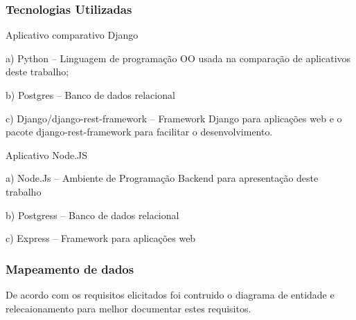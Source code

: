 \subsubsection{Tecnologias Utilizadas}


  Aplicativo comparativo Django
    
    \begin{compactitem}
      \item[a)] Python – Linguagem de programação OO usada na comparação de aplicativos deste trabalho;
      \item[b)] Postgres – Banco de dados relacional
      \item[c)] Django/django-rest-framework – Framework Django para aplicações web e o pacote django-rest-framework
      para facilitar o desenvolvimento.
    \end{compactitem}
    
  Aplicativo Node.JS
  
    \begin{compactitem}
      \item[a)] Node.Js – Ambiente de Programação Backend para apresentação deste trabalho
      \item[b)] Postgress – Banco de dados relacional
      \item[c)] Express – Framework para aplicações web
    \end{compactitem}
 
\subsubsection{Mapeamento de dados}

  De acordo com os requisitos elicitados foi contruido o diagrama de entidade e relecaionamento para melhor
  documentar estes requisitos.
  
